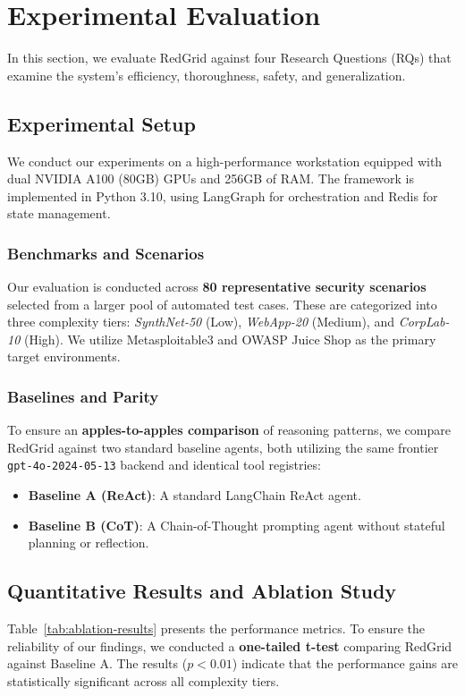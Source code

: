 \section{Experimental Evaluation}

In this section, we evaluate RedGrid against four Research Questions (RQs) that examine the system's efficiency, thoroughness, safety, and generalization.

\subsection{Experimental Setup}
We conduct our experiments on a high-performance workstation equipped with dual NVIDIA A100 (80GB) GPUs and 256GB of RAM. The framework is implemented in Python 3.10, using LangGraph for orchestration and Redis for state management. 

\subsubsection{Benchmarks and Scenarios}
Our evaluation is conducted across \textbf{80 representative security scenarios} selected from a larger pool of automated test cases. These are categorized into three complexity tiers: \textit{SynthNet-50} (Low), \textit{WebApp-20} (Medium), and \textit{CorpLab-10} (High). We utilize Metasploitable3 and OWASP Juice Shop as the primary target environments.



\subsubsection{Baselines and Parity}
To ensure an \textbf{apples-to-apples comparison} of reasoning patterns, we compare RedGrid against two standard baseline agents, both utilizing the same frontier \texttt{gpt-4o-2024-05-13} backend and identical tool registries:
\begin{itemize}
    \item \textbf{Baseline A (ReAct)}: A standard LangChain ReAct agent.
    \item \textbf{Baseline B (CoT)}: A Chain-of-Thought prompting agent without stateful planning or reflection.
\end{itemize}



\subsection{Quantitative Results and Ablation Study}
Table~\ref{tab:ablation-results} presents the performance metrics. To ensure the reliability of our findings, we conducted a \textbf{one-tailed t-test} comparing RedGrid against Baseline A. The results ($p < 0.01$) indicate that the performance gains are statistically significant across all complexity tiers.

